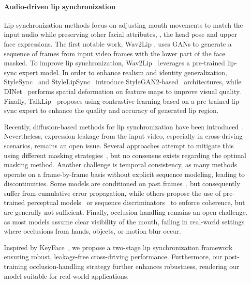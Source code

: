 

\paragraph{Audio-driven lip synchronization}
Lip synchronization methods focus on adjusting mouth movements to match the input audio while preserving other facial attributes, \ie, the head pose and upper face expressions. The first notable work, Wav2Lip \cite{Prajwal}, uses GANs to generate a sequence of frames from input video frames with the lower part of the face masked. To improve lip synchronization, Wav2Lip~\cite{Prajwal} leverages a pre-trained lip-sync expert model. In order to enhance realism and identity generalization, StyleSync~\cite{guan2023stylesync} and StyleLipSync~\cite{StyleLipSync} introduce StyleGAN2-based~\cite{karras2020analyzing} architectures, while DINet~\cite{DINet} performs spatial deformation on feature maps to improve visual quality. Finally, TalkLip~\cite{Zhong_2023_CVPR} proposes using contrastive learning based on a pre-trained lip-sync expert to enhance the quality and accuracy of generated lip region.

Recently, diffusion-based methods for lip synchronization have been introduced~\cite{diff2lip, DiffDub, michaldub}. Nevertheless, expression leakage from the input video, especially in cross-driving scenarios, remains an open issue. Several approaches attempt to mitigate this using different masking strategies~\cite{StyleLipSync, DINet, zhang_musetalk_2024, VideoReTalking}, but no consensus exists regarding the optimal masking method. Another challenge is temporal consistency, as many methods~\cite{maketalk, DiffDub, stylepres} operate on a frame-by-frame basis without explicit sequence modeling, leading to discontinuities. Some models are conditioned on past frames~\cite{michaldub}, but consequently suffer from cumulative error propagation, while others propose the use of pre-trained perceptual models~\cite{latentsync} or sequence discriminators~\cite{diff2lip} to enforce coherence, but are generally not sufficient. Finally, occlusion handling remains an open challenge, as most models assume clear visibility of the mouth, failing in real-world settings where occlusions from hands, objects, or motion blur occur.

Inspired by KeyFace~\cite{keyface}, we propose a two-stage lip synchronization framework ensuring robust, leakage-free cross-driving performance. Furthermore, our post-training occlusion-handling strategy further enhances robustness, rendering our model suitable for real-world applications.
